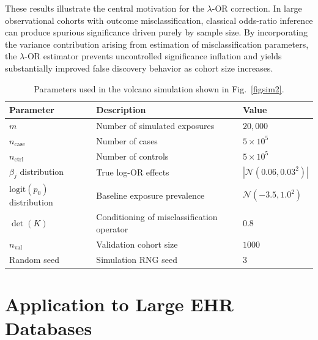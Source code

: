 \documentclass[pdflatex,sn-mathphys-num]{sn-jnl}%
\theoremstyle{thmstyleone}%
\theoremstyle{thmstyletwo}%
\theoremstyle{thmstylethree}%
\begin{document}
These results illustrate the central motivation for the $\lambda$-OR correction. In large observational cohorts with outcome misclassification, classical odds-ratio inference can produce spurious significance driven purely by sample size. By incorporating the variance contribution arising from estimation of misclassification parameters, the $\lambda$-OR estimator prevents uncontrolled significance inflation and yields substantially improved false discovery behavior as cohort size increases.


\begin{table}[t]
\centering
\caption{Parameters used in the volcano simulation shown in
Fig.~\ref{figsim2}.}
\label{tab:sim-volcano-params}
\begin{tabular}{lll}
\hline
Parameter & Description & Value \\
\hline
$m$ & Number of simulated exposures & $20{,}000$ \\
$n_{\mathrm{case}}$ & Number of cases & $5\times10^{5}$ \\
$n_{\mathrm{ctrl}}$ & Number of controls & $5\times10^{5}$ \\
$\beta_j$ distribution & True log-OR effects & $|\mathcal{N}(0.06,0.03^2)|$ \\
$\mathrm{logit}(p_0)$ distribution & Baseline exposure prevalence & $\mathcal{N}(-3.5,1.0^2)$ \\
$\det(K)$ & Conditioning of misclassification operator & $0.8$ \\
$n_{\mathrm{val}}$ & Validation cohort size & $1000$ \\
Random seed & Simulation RNG seed & $3$ \\
\hline
\end{tabular}
\end{table}














\section{Application to Large EHR Databases}
\end{document}
